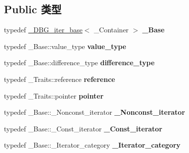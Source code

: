 \subsection*{Public 类型}
\begin{DoxyCompactItemize}
\item 
\mbox{\label{struct___d_b_g__iter_a491779431ed719d677d490f80e3cef4e}} 
typedef \hyperlink{struct___d_b_g__iter__base}{\+\_\+\+D\+B\+G\+\_\+iter\+\_\+base}$<$ \+\_\+\+Container $>$ {\bfseries \+\_\+\+Base}
\item 
\mbox{\label{struct___d_b_g__iter_a5ed89470a4b3a7708baf57c78fd9cf48}} 
typedef \+\_\+\+Base\+::value\+\_\+type {\bfseries value\+\_\+type}
\item 
\mbox{\label{struct___d_b_g__iter_a0e1aca04e90bcf4465ab4e495453889f}} 
typedef \+\_\+\+Base\+::difference\+\_\+type {\bfseries difference\+\_\+type}
\item 
\mbox{\label{struct___d_b_g__iter_a4648bca26d380ceda1914b617760018d}} 
typedef \+\_\+\+Traits\+::reference {\bfseries reference}
\item 
\mbox{\label{struct___d_b_g__iter_a624ce9f7f3b8ab350546953d17f00ea9}} 
typedef \+\_\+\+Traits\+::pointer {\bfseries pointer}
\item 
\mbox{\label{struct___d_b_g__iter_ad0942b7fbb94d14de743bf9134a6a296}} 
typedef \+\_\+\+Base\+::\+\_\+\+Nonconst\+\_\+iterator {\bfseries \+\_\+\+Nonconst\+\_\+iterator}
\item 
\mbox{\label{struct___d_b_g__iter_a2272c4de718a83655dede4a009e2e67c}} 
typedef \+\_\+\+Base\+::\+\_\+\+Const\+\_\+iterator {\bfseries \+\_\+\+Const\+\_\+iterator}
\item 
\mbox{\label{struct___d_b_g__iter_a3f8baee93225dcccab7a56c3eb52491a}} 
typedef \+\_\+\+Base\+::\+\_\+\+Iterator\+\_\+category {\bfseries \+\_\+\+Iterator\+\_\+category}
\end{DoxyCompactItemize}
